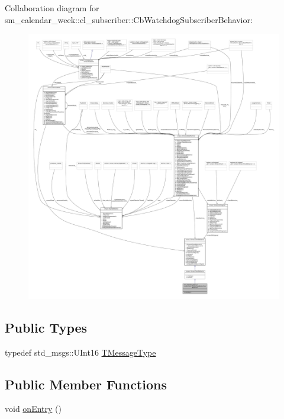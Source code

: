 Collaboration diagram for sm\+\_\+calendar\+\_\+week\+:\+:cl\+\_\+subscriber\+:\+:Cb\+Watchdog\+Subscriber\+Behavior\+:
\nopagebreak
\begin{figure}[H]
\begin{center}
\leavevmode
\includegraphics[width=350pt]{classsm__calendar__week_1_1cl__subscriber_1_1CbWatchdogSubscriberBehavior__coll__graph}
\end{center}
\end{figure}
\subsection*{Public Types}
\begin{DoxyCompactItemize}
\item 
typedef std\+\_\+msgs\+::\+U\+Int16 \hyperlink{classsm__calendar__week_1_1cl__subscriber_1_1CbWatchdogSubscriberBehavior_acac137f7ddee9f2efad218255ec48da6}{T\+Message\+Type}
\end{DoxyCompactItemize}
\subsection*{Public Member Functions}
\begin{DoxyCompactItemize}
\item 
void \hyperlink{classsm__calendar__week_1_1cl__subscriber_1_1CbWatchdogSubscriberBehavior_a291895411a45ffe349a6117d51e11212}{on\+Entry} ()
\end{DoxyCompactItemize}
